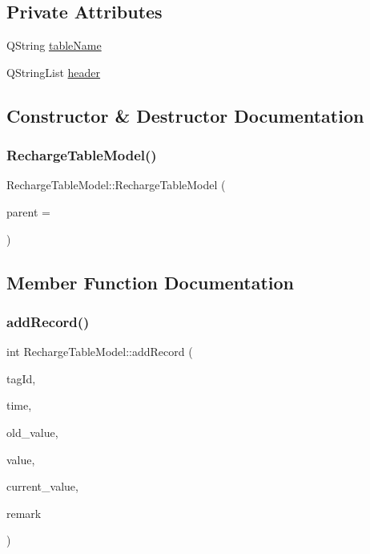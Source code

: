 \subsection*{Private Attributes}
\begin{DoxyCompactItemize}
\item 
Q\+String \mbox{\hyperlink{class_recharge_table_model_a710733d9714fdf177f2f31507c42180c}{table\+Name}}
\item 
Q\+String\+List \mbox{\hyperlink{class_recharge_table_model_a2c05ed8c1a95ed985eb26f5721e04fce}{header}}
\end{DoxyCompactItemize}


\subsection{Constructor \& Destructor Documentation}
\mbox{\label{class_recharge_table_model_a62106e9be4a9d706aa0ee3ad265099d0}} 
\subsubsection{\texorpdfstring{RechargeTableModel()}{RechargeTableModel()}}
{\footnotesize\ttfamily Recharge\+Table\+Model\+::\+Recharge\+Table\+Model (\begin{DoxyParamCaption}\item[{Q\+Object $\ast$}]{parent = {} }\end{DoxyParamCaption})\hspace{0.3cm}{\ttfamily [explicit]}}



\subsection{Member Function Documentation}
\mbox{\label{class_recharge_table_model_a3717a682f1efe46f47cd2101cef9a467}} 
\subsubsection{\texorpdfstring{addRecord()}{addRecord()}}
{\footnotesize\ttfamily int Recharge\+Table\+Model\+::add\+Record (\begin{DoxyParamCaption}\item[{Q\+String}]{tag\+Id,  }\item[{Q\+String}]{time,  }\item[{Q\+String}]{old\+\_\+value,  }\item[{Q\+String}]{value,  }\item[{Q\+String}]{current\+\_\+value,  }\item[{Q\+String}]{remark }\end{DoxyParamCaption})}



